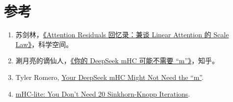 \documentclass[UTF8,11pt]{ctexart}
\begin{document}
\section*{参考}

\begin{enumerate}[leftmargin=2em]
  \item 苏剑林，\href{https://spaces.ac.cn/archives/11664}{《Attention Residuals 回忆录：兼谈 Linear Attention 的 Scale Law》}，科学空间。
  \item 涮月亮的谪仙人，\href{https://zhuanlan.zhihu.com/p/2010852389670908320}{《你的 DeepSeek mHC 可能不需要 ``m''》}，知乎。
  \item Tyler Romero, \href{https://www.tylerromero.com/translations/zhihu/your-deepseek-mhc-might-not-need-the-m/}{Your DeepSeek mHC Might Not Need the ``m''}.
  \item \href{https://arxiv.org/abs/2601.05732}{mHC-lite: You Don't Need 20 Sinkhorn-Knopp Iterations}.
\end{enumerate}
\end{document}
